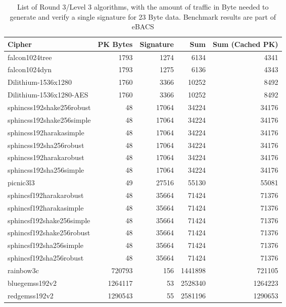 \begin{table}[t]
  \small
  \caption{List of Round 3/Level 3 algorithms, with the amount of traffic in Byte needed to generate and verify a single signature for 23 Byte data. Benchmark results are part of eBACS\cite{eBACS}}
  \begin{center}
      \begin{tabularx}{\textwidth}{X|rrrr}
      \hline
      \textbf{Cipher}  & \textbf{PK Bytes}  & \textbf{Signature}  & \textbf{Sum} & \textbf{Sum (Cached PK)}  \\
      \hline
      falcon1024tree & 1793 & 1274 & 6134 & 4341 \\
      falcon1024dyn & 1793 & 1275 & 6136 & 4343 \\
      Dilithium-1536x1280 & 1760 & 3366 & 10252 & 8492\\
      Dilithium-1536x1280-AES & 1760 & 3366 & 10252 & 8492\\
      sphincss192shake256robust & 48 & 17064 & 34224 & 34176\\
      sphincss192shake256simple & 48 & 17064 & 34224 & 34176\\
      sphincss192harakasimple & 48 & 17064 & 34224 & 34176\\
      sphincss192sha256robust & 48 & 17064 & 34224 & 34176\\
      sphincss192harakarobust & 48 & 17064 & 34224 & 34176\\
      sphincss192sha256simple & 48 & 17064 & 34224 & 34176\\
      picnic3l3 & 49 & 27516 & 55130 & 55081\\
      sphincsf192harakarobust & 48 & 35664 & 71424 & 71376\\
      sphincsf192harakasimple & 48 & 35664 & 71424 & 71376\\
      sphincsf192shake256simple & 48 & 35664 & 71424 & 71376\\
      sphincsf192shake256robust & 48 & 35664 & 71424 & 71376\\
      sphincsf192sha256simple & 48 & 35664 & 71424 & 71376\\
      sphincsf192sha256robust & 48 & 35664 & 71424 & 71376\\
      rainbow3c & 720793 & 156 & 1441898 & 721105\\
      bluegemss192v2 & 1264117 & 53 & 2528340 & 1264223\\
      redgemss192v2 & 1290543 & 55 & 2581196 & 1290653\\
  
      \hline
  \end{tabularx}
  \end{center}
  \label{table:r3_dsa_data}
\end{table}
